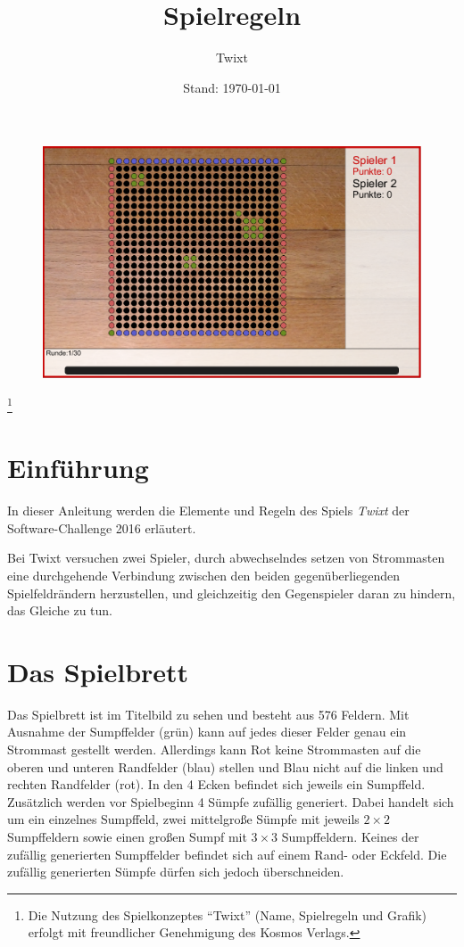 \documentclass[a4paper, ngerman]{scrartcl}
\title{Spielregeln}
\subtitle{Twixt}
\date{Stand: \today}
\newcommand\blfootnote[1]{%
  \begingroup
  \renewcommand\thefootnote{}\footnote{#1}%
  \addtocounter{footnote}{-1}%
  \endgroup
}
\begin{document}
\maketitle

\begin{figure}[!htbp]
  \centering
  \includegraphics[width=\linewidth]{bilder/gui.png}
\end{figure}
\vspace*{\fill}

\blfootnote{Die Nutzung des Spielkonzeptes "`Twixt"' (Name, Spielregeln und Grafik)
  erfolgt mit freundlicher Genehmigung des Kosmos Verlags.}

\newpage

\section{Einführung}

In dieser Anleitung werden die Elemente und Regeln des Spiels \emph{Twixt} der
Software-Challenge 2016 erläutert.

Bei Twixt versuchen zwei Spieler, durch abwechselndes setzen von Strommasten
eine durchgehende Verbindung zwischen den beiden gegenüberliegenden Spielfeldrändern
herzustellen, und gleichzeitig den Gegenspieler daran zu hindern, das Gleiche zu
tun.

\section{Das Spielbrett}
Das Spielbrett ist im Titelbild zu sehen und besteht aus 576 Feldern.
Mit Ausnahme der Sumpffelder (grün) kann auf jedes dieser Felder genau
ein Strommast gestellt werden. Allerdings kann Rot keine Strommasten auf
die oberen und unteren Randfelder (blau) stellen und Blau nicht auf die linken
und rechten Randfelder (rot). In den 4 Ecken befindet sich jeweils ein Sumpffeld.
Zusätzlich werden vor Spielbeginn 4 Sümpfe zufällig generiert. Dabei handelt sich um
ein einzelnes Sumpffeld, zwei mittelgroße Sümpfe mit jeweils $2 \times 2$ Sumpffeldern
sowie einen großen Sumpf mit $3 \times 3$ Sumpffeldern. Keines der zufällig generierten Sumpffelder
befindet sich auf einem Rand- oder Eckfeld. Die zufällig generierten Sümpfe dürfen
sich jedoch überschneiden.
\end{document}
